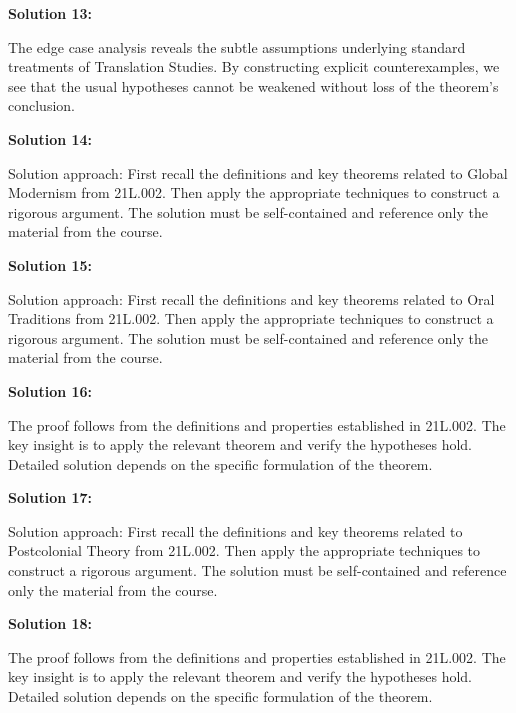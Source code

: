 \documentclass[12pt,a4paper]{exam}
\begin{document}
\vspace{0.5cm}

\textbf{Solution 13:}

The edge case analysis reveals the subtle assumptions underlying standard treatments of Translation Studies. By constructing explicit counterexamples, we see that the usual hypotheses cannot be weakened without loss of the theorem's conclusion.

\vspace{0.5cm}

\textbf{Solution 14:}

Solution approach: First recall the definitions and key theorems related to Global Modernism from 21L.002. Then apply the appropriate techniques to construct a rigorous argument. The solution must be self-contained and reference only the material from the course.

\vspace{0.5cm}

\textbf{Solution 15:}

Solution approach: First recall the definitions and key theorems related to Oral Traditions from 21L.002. Then apply the appropriate techniques to construct a rigorous argument. The solution must be self-contained and reference only the material from the course.

\vspace{0.5cm}

\textbf{Solution 16:}

The proof follows from the definitions and properties established in 21L.002. The key insight is to apply the relevant theorem and verify the hypotheses hold. Detailed solution depends on the specific formulation of the theorem.

\vspace{0.5cm}

\textbf{Solution 17:}

Solution approach: First recall the definitions and key theorems related to Postcolonial Theory from 21L.002. Then apply the appropriate techniques to construct a rigorous argument. The solution must be self-contained and reference only the material from the course.

\vspace{0.5cm}

\textbf{Solution 18:}

The proof follows from the definitions and properties established in 21L.002. The key insight is to apply the relevant theorem and verify the hypotheses hold. Detailed solution depends on the specific formulation of the theorem.
\end{document}
